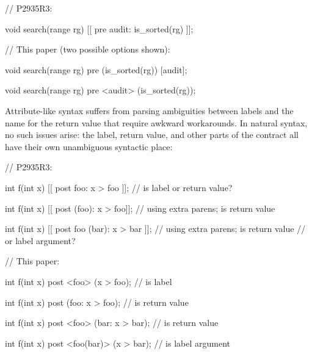 \begin{minipage}[t]{8cm}
\begin{codeblock}
// P2935R3:

void search(range rg)
  [[ pre audit: is_sorted(rg) ]];
\end{codeblock}
\end{minipage}
\begin{minipage}[t]{8cm}
\begin{codeblock}
// This paper (two possible options shown):

void search(range rg)
  pre (is_sorted(rg)) [audit];
  
void search(range rg)
  pre <audit> (is_sorted(rg));
\end{codeblock}
\end{minipage}

Attribute-like syntax suffers from parsing ambiguities between labels and the name for the return value that require awkward workarounds. In natural syntax, no such issues arise: the label, return value, and other parts of the contract all have their own unambiguous syntactic place:

\begin{minipage}[t]{8cm}
\begin{codeblock}
// P2935R3:

int f(int x)
  [[ post foo: x > foo ]];  
  // is  label or return value?

int f(int x)
  [[ post (foo): x > foo]];  
  // using extra parens;  is return value

int f(int x)
  [[ post foo (bar): x > bar ]];  
  // using extra parens; is  return value
  // or label argument?
\end{codeblock}
\end{minipage}
\begin{minipage}[t]{8cm}
\begin{codeblock}
// This paper:

int f(int x)
  post <foo> (x > foo);
  //  is label

int f(int x)
  post (foo: x > foo);
  //  is return value

int f(int x)
  post <foo> (bar: x > bar); 
  //   is return value

int f(int x)
  post <foo(bar)> (x > bar);
  //  is label argument
\end{codeblock}
\end{minipage}

